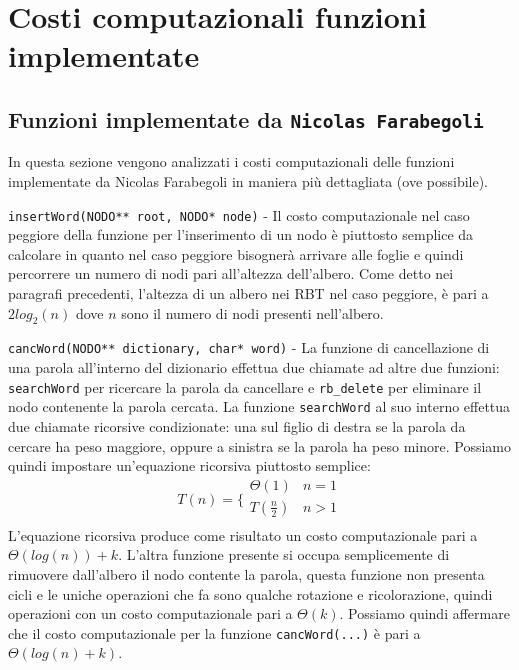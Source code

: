 \documentclass[paper=a4, fontsize=11pt,twoside]{scrartcl}   %
\begin{document}
		\section{Costi computazionali funzioni implementate}
			\subsection{Funzioni implementate da \texttt{Nicolas Farabegoli}}
				In questa sezione vengono analizzati i costi computazionali delle funzioni implementate da Nicolas Farabegoli in maniera più dettagliata (ove possibile).
								
				\texttt{insertWord(NODO** root, NODO* node)} - Il costo computazionale nel caso peggiore della funzione per l'inserimento di un nodo è piuttosto semplice da calcolare in quanto nel caso peggiore bisognerà arrivare alle foglie e quindi percorrere un numero di nodi pari all'altezza dell'albero. Come detto nei paragrafi precedenti, l'altezza di un albero nei RBT nel caso peggiore, è pari a $2log_2(n)$ dove $n$ sono il numero di nodi presenti nell'albero.\par
				
				\texttt{cancWord(NODO** dictionary, char* word)} - La funzione di cancellazione di una parola all'interno del dizionario effettua due chiamate ad altre due funzioni: \texttt{searchWord} per ricercare la parola da cancellare e \texttt{rb\_delete} per eliminare il nodo contenente la parola cercata. La funzione \texttt{searchWord} al suo interno effettua due chiamate ricorsive condizionate: una sul figlio di destra se la parola da cercare ha peso maggiore, oppure a sinistra se la parola ha peso minore. Possiamo quindi impostare un'equazione ricorsiva piuttosto semplice:				
				$$T(n) =
				\bigg \{
				\begin{array}{rl}
				\Theta(1) & n = 1 \\
				T(\frac{n}{2}) & n > 1 \\
				\end{array}
				$$
				L'equazione ricorsiva produce come risultato un costo computazionale pari a $\Theta(log(n)) + k$.
				L'altra funzione presente si occupa semplicemente di rimuovere dall'albero il nodo contente la parola, questa funzione non presenta cicli e le uniche operazioni che fa sono qualche rotazione e ricolorazione, quindi operazioni con un costo computazionale pari a $\Theta(k)$.
				Possiamo quindi affermare che il costo computazionale per la funzione \texttt{cancWord(...)} è pari a $\Theta(log(n) + k)$.\par
				
\end{document}
